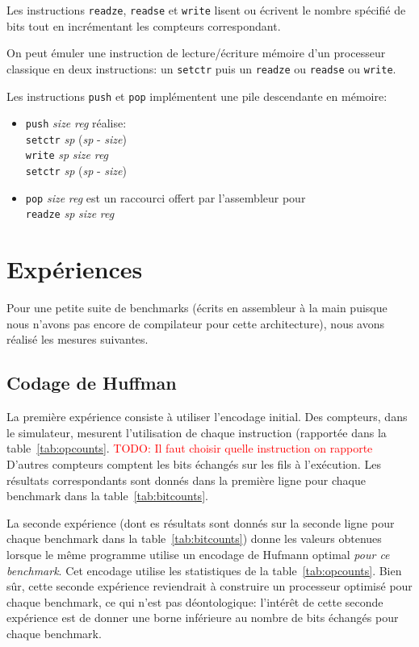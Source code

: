 \documentclass[architecture]{compas2018}
\newcommand{\todo}[1]{\textcolor{red}{TODO: #1}}
\begin{document}
Les instructions \texttt{readze}, \texttt{readse} et \texttt{write} lisent ou écrivent le nombre spécifié de bits tout en incrémentant les compteurs correspondant.

On peut émuler une instruction de lecture/écriture mémoire d'un processeur classique en deux instructions: un \texttt{setctr} puis un \texttt{readze} ou \texttt{readse} ou \texttt{write}.

Les instructions \texttt{push} et \texttt{pop} implémentent une pile descendante en mémoire: 
\begin{itemize}
\item \texttt{push} \emph{size} \emph{reg} réalise: \\
   \texttt{setctr} \textit{sp} (\textit{sp} - \textit{size})\\ \texttt{write}  \textit{sp} \textit{size} \textit{reg} \\ \texttt{setctr} \textit{sp} (\textit{sp} - \textit{size})
\item \texttt{pop} \emph{size} \emph{reg} est un raccourci offert par l'assembleur pour \\\texttt{readze} \textit{sp} \emph{size} \emph{reg}\\
  
\end{itemize}


\section{Expériences}
Pour une petite suite de benchmarks (écrits en assembleur à la main puisque nous n'avons pas encore de compilateur pour cette architecture), nous avons réalisé les mesures suivantes.

\subsection{Codage de Huffman}
La première expérience consiste à utiliser l'encodage initial.
Des compteurs, dans le simulateur, mesurent l'utilisation de chaque instruction (rapportée dans la table~\ref{tab:opcounts}. \todo{Il faut choisir quelle instruction on rapporte}
D'autres compteurs comptent les bits échangés sur les fils à l'exécution.
Les résultats correspondants sont donnés dans la première  ligne pour chaque benchmark dans la table~\ref{tab:bitcounts}.

La seconde expérience (dont es résultats sont donnés sur la seconde ligne pour chaque benchmark dans la table~\ref{tab:bitcounts}) donne les valeurs obtenues lorsque le même programme utilise un encodage de Hufmann optimal \emph{pour ce benchmark}.
Cet encodage utilise les statistiques de la table~\ref{tab:opcounts}.
Bien sûr, cette seconde expérience reviendrait à construire un processeur optimisé pour chaque benchmark, ce qui n'est pas déontologique: l'intérêt de cette seconde expérience est de donner une borne inférieure au nombre de bits échangés pour chaque benchmark. 
\end{document}
